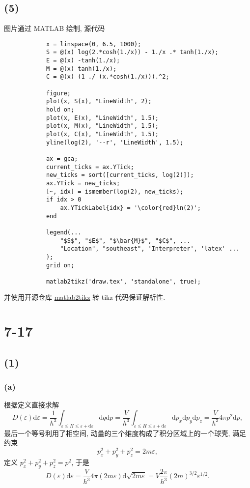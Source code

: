 \documentclass[
    lang=cn,
    column=onecolumn
]{spArticle}
\begin{document}
        \subsection{(5)}
            图片通过 MATLAB 绘制, 源代码
            \begin{mdframed}
            \begin{Verbatim}
            x = linspace(0, 6.5, 1000);
            S = @(x) log(2.*cosh(1./x)) - 1./x .* tanh(1./x);
            E = @(x) -tanh(1./x);
            M = @(x) tanh(1./x);
            C = @(x) (1 ./ (x.*cosh(1./x))).^2;

            figure;
            plot(x, S(x), "LineWidth", 2);
            hold on;
            plot(x, E(x), "LineWidth", 1.5);
            plot(x, M(x), "LineWidth", 1.5);
            plot(x, C(x), "LineWidth", 1.5);
            yline(log(2), '--r', 'LineWidth', 1.5);

            ax = gca;
            current_ticks = ax.YTick;
            new_ticks = sort([current_ticks, log(2)]);
            ax.YTick = new_ticks;
            [~, idx] = ismember(log(2), new_ticks);
            if idx > 0
                ax.YTickLabel{idx} = '\color{red}ln(2)';
            end

            legend(...
                "$S$", "$E$", "$\bar{M}$", "$C$", ...
                "Location", "southeast", 'Interpreter', 'latex' ...
            );
            grid on;

            matlab2tikz('draw.tex', 'standalone', true);
            \end{Verbatim}
            \end{mdframed}
            并使用开源仓库 \href{https://github.com/matlab2tikz/matlab2tikz.git}{matlab2tikz} 转 tikz 代码保证解析性.
            
    \section{7-17}
        \subsection{(1)}
            \subsubsection{(a)}
                根据定义直接求解
                $$
                D\left( \varepsilon \right) \mathrm{d}\varepsilon =\frac{1}{h^3}\int_{\varepsilon \le H\le \varepsilon +\mathrm{d}\varepsilon}{\mathrm{d}q\mathrm{d}p}=\frac{V}{h^3}\int_{\varepsilon \le H\le \varepsilon +\mathrm{d}\varepsilon}{\mathrm{d}p_x\mathrm{d}p_y\mathrm{d}p_z}=\frac{V}{h^3}4\pi p^2\mathrm{d}p,
                $$
                最后一个等号利用了相空间, 动量的三个维度构成了积分区域上的一个球壳, 满足约束
                $$
                p_{x}^{2}+p_{y}^{2}+p_{z}^{2}=2m\varepsilon ,
                $$
                定义 $p_{x}^{2}+p_{y}^{2}+p_{z}^{2}=p^2$, 于是
                $$
                D\left( \varepsilon \right) \mathrm{d}\varepsilon =\frac{V}{h^3}4\pi \left( 2m\varepsilon \right) \mathrm{d}\sqrt{2m\varepsilon}=V\frac{2\pi}{h^3}\left( 2m \right) ^{3/2}\varepsilon ^{1/2}.
                $$
\end{document}
